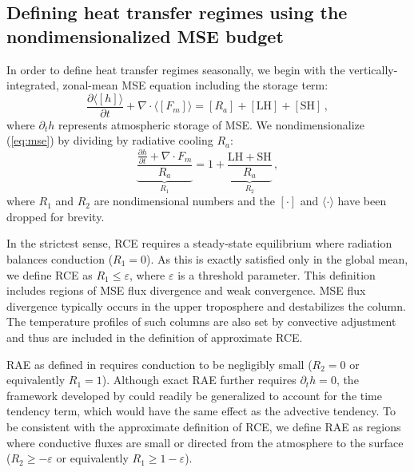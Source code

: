 \documentclass{ametsocV5}
\begin{document}
    \subsection{Defining heat transfer regimes using the nondimensionalized MSE budget} \label{subsec:mse}

    In order to define heat transfer regimes seasonally, we begin with the vertically-integrated, zonal-mean MSE equation including the storage term:
    \begin{equation} \label{eq:mse}
        \frac{\partial \langle [h] \rangle}{\partial t} + \nabla\cdot \langle [F_{m}]\rangle = [R_{a}] + \mathrm{[LH]+[SH]} \, ,
    \end{equation}
    where $\partial_t h$ represents atmospheric storage of MSE. We nondimensionalize (\ref{eq:mse}) by dividing by radiative cooling $R_a$:
    \begin{equation}
        {\underbrace{\frac{\frac{\partial h }{\partial t} + \nabla\cdot F_{m}}{R_{a}}}_{R_1}} = 1 + {\underbrace{\frac{\mathrm{LH+SH}}{R_{a}}}_{R_2}} \, ,
    \end{equation}
    where $R_1$ and $R_2$ are nondimensional numbers and the $[\cdot]$ and $\langle\cdot\rangle$ have been dropped for brevity. 
    
    In the strictest sense, RCE requires a steady-state equilibrium where radiation balances conduction (\(R_{1}=0\)). As this is exactly satisfied only in the global mean, we define RCE as \(R_{1}\le \varepsilon\), where $\varepsilon$ is a threshold parameter. This definition includes regions of MSE flux divergence and weak convergence. MSE flux divergence typically occurs in the upper troposphere and destabilizes the column. The temperature profiles of such columns are also set by convective adjustment \citep{warren2020} and thus are included in the definition of approximate RCE.
    
    RAE as defined in \cite{cronin2016} requires conduction to be negligibly small (\(R_{2}=0\) or equivalently \(R_{1}=1\)). Although exact RAE further requires $\partial_t h=0$, the framework developed by \cite{cronin2016} could readily be generalized to account for the time tendency term, which would have the same effect as the advective tendency. To be consistent with the approximate definition of RCE, we define RAE as regions where conductive fluxes are small or directed from the atmosphere to the surface (\(R_{2} \ge -\varepsilon \) or equivalently \(R_{1} \ge 1-\varepsilon\)).
      
\end{document}
